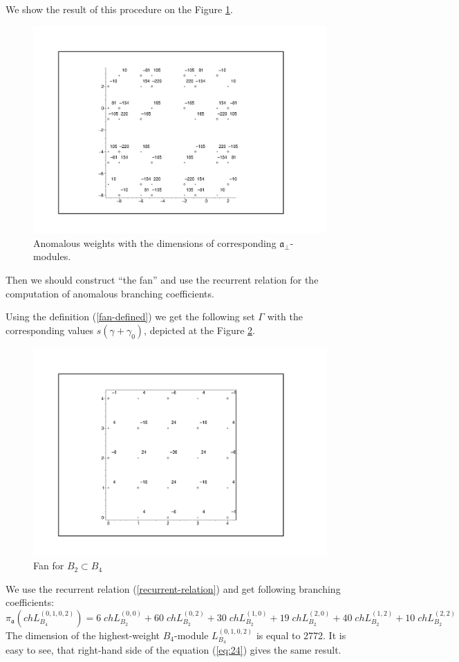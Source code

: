 \documentclass[a4paper,12pt]{article}
\theoremstyle{definition} \newtheorem{Def}{Definition}
\begin{document}
We show the result of this procedure on the Figure \ref{fig:B4B2anom}.
\begin{figure}[h!tb]
    \includegraphics[width=150mm]{B4_B2_anom_points.pdf}
  \caption{Anomalous weights with the dimensions of corresponding $\mathfrak{a}_{\bot}$-modules.}
  \label{fig:B4B2anom}
\end{figure}

Then we should construct ``the fan'' and use the recurrent relation for the computation of anomalous branching coefficients.

Using the definition (\ref{fan-defined}) we get the following set $\Gamma$ with the corresponding values $s(\gamma+\gamma_0)$, depicted at the Figure \ref{fig:B4B2Fan}.
\begin{figure}[h!tb]
  \includegraphics[width=130mm]{B4_B2_fan.pdf}
  \caption{Fan for $B_2\subset B_4$}
  \label{fig:B4B2Fan}
\end{figure}
We use the recurrent relation (\ref{recurrent-relation}) and get
following branching coefficients:
\begin{equation}
  \label{eq:24}
  \pi_{\mathfrak{a}} \left(ch L^{(0,1,0,2)}_{B_4}\right) = 6 \; ch L^{(0,0)}_{B_2}+ 60
  \; ch L_{B_2}^{(0,2)}+ 30 \; ch L_{B_2}^{(1,0)}+ 19 \; ch L_{B_2}^{(2,0)}+
  40 \; ch L_{B_2}^{(1,2)}+ 10 \; ch L_{B_2}^{(2,2)}
\end{equation}
The dimension of the highest-weight $B_4$-module $L^{(0,1,0,2)}_{B_4}$
is equal to 2772. It is easy to see, that right-hand side of the
equation (\ref{eq:24}) gives the same result.
\end{document}
